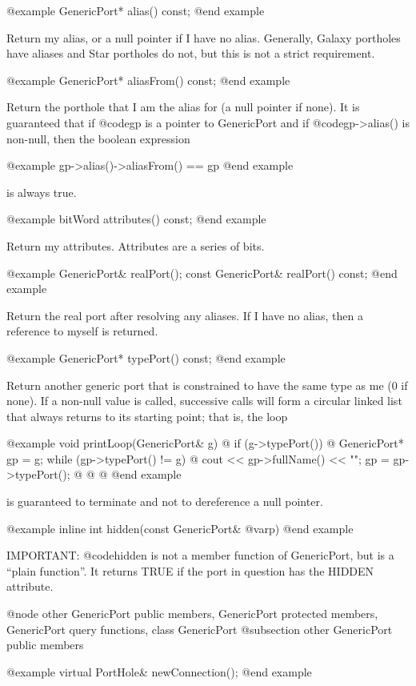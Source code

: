 @example
GenericPort* alias() const;
@end example

Return my alias, or a null pointer if I have no alias.  Generally,
Galaxy portholes have aliases and Star portholes do not, but this
is not a strict requirement.

@example
GenericPort* aliasFrom() const;
@end example

Return the porthole that I am the alias for (a null pointer if none).
It is guaranteed that if @code{gp} is a pointer to GenericPort and if
@code{gp->alias()} is non-null, then the boolean expression

@example
gp->alias()->aliasFrom() == gp
@end example

is always true.

@example
bitWord attributes() const;
@end example

Return my attributes.  Attributes are a series of bits.

@example
GenericPort& realPort();
const GenericPort& realPort() const;
@end example

Return the real port after resolving any aliases.  If I have no alias,
then a reference to myself is returned.

@example
GenericPort* typePort() const;
@end example

Return another generic port that is constrained to have the same type as
me (0 if none).  If a non-null value is called, successive calls will
form a circular linked list that always returns to its starting point;
that is, the loop

@example
void printLoop(GenericPort& g) @{
        if (g->typePort()) @{
                GenericPort* gp = g;
                while (gp->typePort() != g) @{
                        cout << gp->fullName() << "\n";
                        gp = gp->typePort();
                @}
        @}
@}
@end example

is guaranteed to terminate and not to dereference a null pointer.

@example
inline int hidden(const GenericPort& @var{p})
@end example

IMPORTANT: @code{hidden} is not a member function of GenericPort,
but is a ``plain function''.  It returns TRUE if the port in question
has the HIDDEN attribute.

@node other GenericPort public members, GenericPort protected members, GenericPort query functions, class GenericPort
@subsection other GenericPort public members

@example
virtual PortHole& newConnection();
@end example

